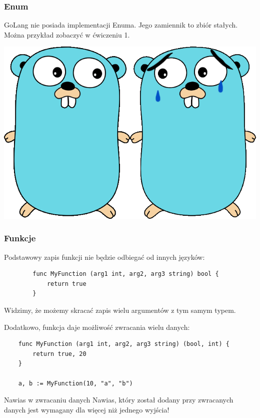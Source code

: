 \documentclass[10pt]{beamer}
\begin{document}
\begin{frame}
    \frametitle{Enum}
    GoLang nie posiada implementacji Enuma. Jego zamiennik to zbiór stałych.
    Można przykład zobaczyć w ćwiczeniu 1.

    \begin{center}
        \includegraphics[scale=0.25]{sad_gophers.png}
    \end{center}
\end{frame}

\begin{frame}[fragile]
    \frametitle{Funkcje}
    Podstawowy zapis funkcji nie będzie odbiegać od innych języków:

    \begin{verbatim}
        func MyFunction (arg1 int, arg2, arg3 string) bool {
            return true
        }
    \end{verbatim}

    Widzimy, że możemy skracać zapis wielu argumentów z tym samym typem.

    Dodatkowo, funkcja daje możliwość zwracania wielu danych:
    \begin{verbatim}
    func MyFunction (arg1 int, arg2, arg3 string) (bool, int) {
        return true, 20
    }
    
    a, b := MyFunction(10, "a", "b")
    \end{verbatim}
    
    \begin{alertblock}{Nawias w zwracaniu danych}
        Nawias, który został dodany przy zwracanych danych jest wymagany
        dla więcej niż jednego wyjścia!
    \end{alertblock}
\end{frame}
\end{document}

